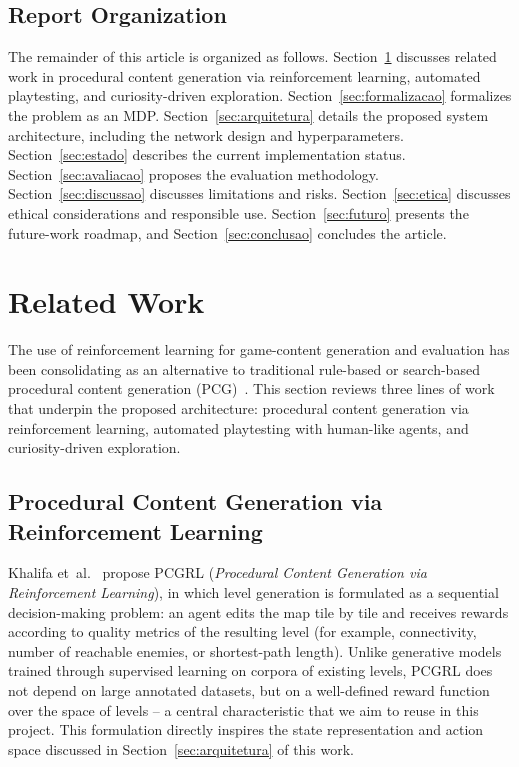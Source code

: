 \documentclass[sigconf,nonacm,language=english]{acmart}
\begin{document}
\subsection{Report Organization}

The remainder of this article is organized as follows.
Section~\ref{sec:relacionados} discusses related work in procedural content
generation via reinforcement learning, automated playtesting, and
curiosity-driven exploration. Section~\ref{sec:formalizacao} formalizes the
problem as an MDP. Section~\ref{sec:arquitetura} details the proposed
system architecture, including the network design and hyperparameters.
Section~\ref{sec:estado} describes the current implementation status.
Section~\ref{sec:avaliacao} proposes the evaluation methodology.
Section~\ref{sec:discussao} discusses limitations and risks.
Section~\ref{sec:etica} discusses ethical considerations and responsible
use. Section~\ref{sec:futuro} presents the future-work roadmap, and
Section~\ref{sec:conclusao} concludes the article.

\section{Related Work}
\label{sec:relacionados}

The use of reinforcement learning for game-content generation and
evaluation has been consolidating as an alternative to traditional
rule-based or search-based procedural content generation
(PCG)~\cite{shaker2016procedural}. This section reviews three lines of work
that underpin the proposed architecture: procedural content generation via
reinforcement learning, automated playtesting with human-like agents, and
curiosity-driven exploration.

\subsection{Procedural Content Generation via Reinforcement Learning}

Khalifa et~al.~\cite{khalifa2020pcgrl} propose PCGRL (\emph{Procedural
Content Generation via Reinforcement Learning}), in which level generation
is formulated as a sequential decision-making problem: an agent edits the
map tile by tile and receives rewards according to quality metrics of the
resulting level (for example, connectivity, number of reachable enemies, or
shortest-path length). Unlike generative models trained through supervised
learning on corpora of existing levels, PCGRL does not depend on large
annotated datasets, but on a well-defined reward function over the space of
levels -- a central characteristic that we aim to reuse in this project.
This formulation directly inspires the state representation and action
space discussed in Section~\ref{sec:arquitetura} of this work.
\end{document}
